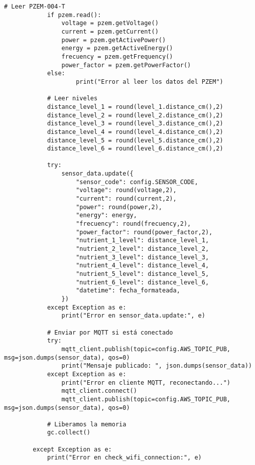 \begin{lstlisting}[label=cod:firmware,caption=Firmware nodo sensor de consumos. , language=PythonUTF8]
            # Leer PZEM-004-T
            if pzem.read():
                voltage = pzem.getVoltage()
                current = pzem.getCurrent()
                power = pzem.getActivePower()
                energy = pzem.getActiveEnergy()
                frecuency = pzem.getFrequency()
                power_factor = pzem.getPowerFactor()
            else:
                    print("Error al leer los datos del PZEM")
            
            # Leer niveles
            distance_level_1 = round(level_1.distance_cm(),2)
            distance_level_2 = round(level_2.distance_cm(),2)
            distance_level_3 = round(level_3.distance_cm(),2)
            distance_level_4 = round(level_4.distance_cm(),2)
            distance_level_5 = round(level_5.distance_cm(),2)
            distance_level_6 = round(level_6.distance_cm(),2)
            
            try:
                sensor_data.update({
                    "sensor_code": config.SENSOR_CODE,
                    "voltage": round(voltage,2),
                    "current": round(current,2),
                    "power": round(power,2),
                    "energy": energy,
                    "frecuency": round(frecuency,2),
                    "power_factor": round(power_factor,2),
                    "nutrient_1_level": distance_level_1,
                    "nutrient_2_level": distance_level_2,
                    "nutrient_3_level": distance_level_3,
                    "nutrient_4_level": distance_level_4,
                    "nutrient_5_level": distance_level_5,
                    "nutrient_6_level": distance_level_6,
                    "datetime": fecha_formateada,
                })
            except Exception as e:
                print("Error en sensor_data.update:", e)
    
            # Enviar por MQTT si está conectado
            try:
                mqtt_client.publish(topic=config.AWS_TOPIC_PUB, msg=json.dumps(sensor_data), qos=0)
                print("Mensaje publicado: ", json.dumps(sensor_data))
            except Exception as e:
                print("Error en cliente MQTT, reconectando...")
                mqtt_client.connect()
                mqtt_client.publish(topic=config.AWS_TOPIC_PUB, msg=json.dumps(sensor_data), qos=0)
                
            # Liberamos la memoria
            gc.collect()
                
        except Exception as e:
            print("Error en check_wifi_connection:", e)
    

\end{lstlisting}
